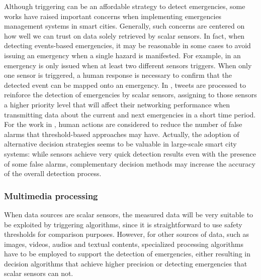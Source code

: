 \begin{refsection}
Although triggering can be an affordable strategy to detect emergencies, some works have raised important concerns when implementing emergencies management systems in smart cities. Generally, such concerns are centered on how well we can trust on data solely retrieved by scalar sensors. In fact, when detecting events-based emergencies, it may be reasonable in some cases to avoid issuing an emergency when a single hazard is manifested. For example, in \cite{iotFire1} an emergency is only issued when at least two different sensors triggers. When only one sensor is triggered, a human response is necessary to confirm that the detected event can be mapped onto an emergency. In \cite{twitterDetection2}, tweets are processed to reinforce the detection of emergencies by scalar sensors, assigning to those sensors a higher priority level that will affect their networking performance when transmitting data about the current and next emergencies in a short time period. For the work in \cite{humanAssisted1}, human actions are considered to reduce the number of false alarms that threshold-based approaches may have. Actually, the adoption of alternative decision strategies seems to be valuable in large-scale smart city systems: while sensors achieve very quick detection results even with the presence of some false alarms, complementary decision methods may increase the accuracy of the overall detection process.

\subsubsection{Multimedia processing}

When data sources are scalar sensors, the measured data will be very suitable to be exploited by triggering algorithms, since it is straightforward to use safety thresholds for comparison purposes. However, for other sources of data, such as images, videos, audios and textual contents, specialized  processing algorithms have to be employed to support the detection of emergencies, either resulting in decision algorithms that achieve higher precision or detecting emergencies that scalar sensors can not. 


\end{refsection}
